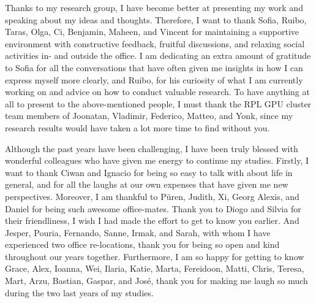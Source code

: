 \noindent 
Thanks to my research group, I have become better at presenting my work and speaking about my ideas and thoughts. Therefore, I want to thank 
Sofia, 
Ruibo, 
Taras, 
Olga, 
Ci, 
Benjamin, 
Maheen, 
and Vincent
for maintaining a supportive environment with constructive feedback, fruitful discussions, and relaxing social activities in- and outside the office. 
I am dedicating an extra amount of gratitude to Sofia for all the conversations that have often given me insights in how I can express myself more clearly, and Ruibo, for his curiosity of what I am currently working on and advice on how to conduct valuable research. 
To have anything at all to present to the above-mentioned people, I must thank the RPL GPU cluster team members of Joonatan, Vladimir, Federico, Matteo, and Yonk, since my research results would have taken a lot more time to find without you. 
\newline 



\noindent 
Although the past years have been challenging, I have been truly blessed with wonderful colleagues who have given me energy to continue my studies.  
Firstly, I want to thank Ciwan and Ignacio for being so easy to talk with about life in general, and for all the laughs at our own expenses that have given me new perspectives. 
Moreover, I am thankful to 
P\"{u}ren, 
Judith, 
Xi, 
Georg
Alexis, 
and Daniel for being such awesome office-mates. 
Thank you to Diogo and Silvia for their friendliness, I wish I had made the effort to get to know you earlier. 
And  
Jesper, 
Pouria, 
Fernando,
Sanne, 
Irmak,
and Sarah, with whom I have experienced two office re-locations, thank you for being so open and kind throughout our years together. 
Furthermore, I am so happy for getting to know 
Grace, 
Alex, 
Ioanna,
Wei,
Ilaria, 
Katie,
Marta, 
Fereidoon,
Matti, 
Chris, 
Teresa, 
Mart,
Arzu, 
Bastian, 
Gaspar, 
and José,
thank you for making me laugh so much during the two last years of my studies. 
\newline 

